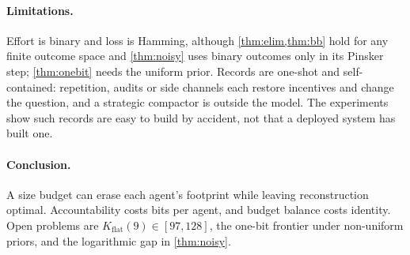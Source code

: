 \documentclass[sigconf,anonymous,acmthm=false]{acmart}
\theoremstyle{acmplain}
\theoremstyle{acmdefinition}
\newcommand{\Kflat}{K_{\mathrm{flat}}}
\begin{document}
\paragraph{Limitations.} Effort is binary and loss is Hamming, although
\cref{thm:elim,thm:bb} hold for any finite outcome space and \cref{thm:noisy} uses binary
outcomes only in its Pinsker step; \cref{thm:onebit} needs the uniform prior. Records are
one-shot and self-contained: repetition, audits or side channels each restore incentives
and change the question, and a strategic compactor is outside the model. The experiments
show such records are easy to build by accident, not that a deployed system has built one.

\paragraph{Conclusion.} A size budget can erase each agent's footprint while leaving
reconstruction optimal. Accountability costs bits per agent, and budget balance costs
identity. Open problems are $\Kflat(9)\in[97,128]$, the one-bit frontier under non-uniform
priors, and the logarithmic gap in \cref{thm:noisy}.

\label{endbody}

\end{document}
